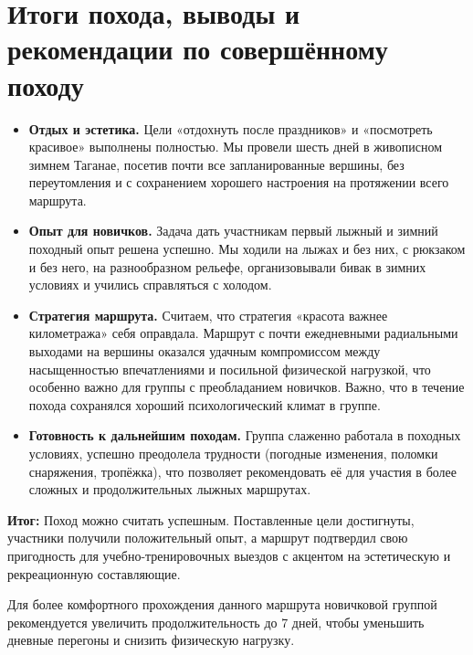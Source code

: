 \section{Итоги похода, выводы и рекомендации по совершённому походу}
\begin{itemize}
	\item \textbf{Отдых и эстетика.} Цели «отдохнуть после праздников» и «посмотреть красивое» выполнены полностью. Мы провели шесть дней в живописном зимнем Таганае, посетив почти все запланированные вершины, без переутомления и с сохранением хорошего настроения на протяжении всего маршрута.
	
	\item \textbf{Опыт для новичков.} Задача дать участникам первый лыжный и зимний походный опыт решена успешно. Мы ходили на лыжах и без них, с рюкзаком и без него, на разнообразном рельефе, организовывали бивак в зимних условиях и учились справляться с холодом.
	
	\item \textbf{Стратегия маршрута.} Считаем, что стратегия «красота важнее километража» себя оправдала. Маршрут с почти ежедневными радиальными выходами на вершины оказался удачным компромиссом между насыщенностью впечатлениями и посильной физической нагрузкой, что особенно важно для группы с преобладанием новичков. Важно, что в течение похода сохранялся хороший психологический климат в группе.
	
	\item \textbf{Готовность к дальнейшим походам.} Группа слаженно работала в походных условиях, успешно преодолела трудности (погодные изменения, поломки снаряжения, тропёжка), что позволяет рекомендовать её для участия в более сложных и продолжительных лыжных маршрутах.
	
\end{itemize}

\textbf{Итог:} Поход можно считать успешным. Поставленные цели достигнуты, участники получили положительный опыт, а маршрут подтвердил свою пригодность для учебно-тренировочных выездов с акцентом на эстетическую и рекреационную составляющие.


Для более комфортного прохождения данного маршрута новичковой группой рекомендуется увеличить продолжительность до 7 дней, чтобы уменьшить дневные перегоны и снизить физическую нагрузку.

	\clearpage